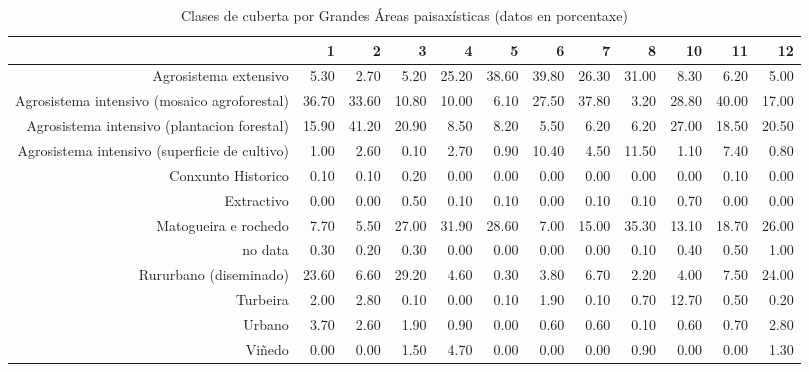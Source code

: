 \begin{table}[p]
\centering
\caption{Clases de cuberta por Grandes Áreas paisaxísticas (datos en porcentaxe)} 
\label{xtaboa2p}
\begin{tabular}{rrrrrrrrrrrr}
  \hline
 & 1 & 2 & 3 & 4 & 5 & 6 & 7 & 8 & 10 & 11 & 12 \\ 
  \hline
Agrosistema extensivo & 5.30 & 2.70 & 5.20 & 25.20 & 38.60 & 39.80 & 26.30 & 31.00 & 8.30 & 6.20 & 5.00 \\ 
  Agrosistema intensivo (mosaico agroforestal) & 36.70 & 33.60 & 10.80 & 10.00 & 6.10 & 27.50 & 37.80 & 3.20 & 28.80 & 40.00 & 17.00 \\ 
  Agrosistema intensivo (plantacion forestal) & 15.90 & 41.20 & 20.90 & 8.50 & 8.20 & 5.50 & 6.20 & 6.20 & 27.00 & 18.50 & 20.50 \\ 
  Agrosistema intensivo (superficie de cultivo) & 1.00 & 2.60 & 0.10 & 2.70 & 0.90 & 10.40 & 4.50 & 11.50 & 1.10 & 7.40 & 0.80 \\ 
  Conxunto Historico & 0.10 & 0.10 & 0.20 & 0.00 & 0.00 & 0.00 & 0.00 & 0.00 & 0.00 & 0.10 & 0.00 \\ 
  Extractivo & 0.00 & 0.00 & 0.50 & 0.10 & 0.10 & 0.00 & 0.10 & 0.10 & 0.70 & 0.00 & 0.00 \\ 
  Matogueira e rochedo & 7.70 & 5.50 & 27.00 & 31.90 & 28.60 & 7.00 & 15.00 & 35.30 & 13.10 & 18.70 & 26.00 \\ 
  no data & 0.30 & 0.20 & 0.30 & 0.00 & 0.00 & 0.00 & 0.00 & 0.10 & 0.40 & 0.50 & 1.00 \\ 
  Rururbano (diseminado) & 23.60 & 6.60 & 29.20 & 4.60 & 0.30 & 3.80 & 6.70 & 2.20 & 4.00 & 7.50 & 24.00 \\ 
  Turbeira & 2.00 & 2.80 & 0.10 & 0.00 & 0.10 & 1.90 & 0.10 & 0.70 & 12.70 & 0.50 & 0.20 \\ 
  Urbano & 3.70 & 2.60 & 1.90 & 0.90 & 0.00 & 0.60 & 0.60 & 0.10 & 0.60 & 0.70 & 2.80 \\ 
  Viñedo & 0.00 & 0.00 & 1.50 & 4.70 & 0.00 & 0.00 & 0.00 & 0.90 & 0.00 & 0.00 & 1.30 \\ 
   \hline
\end{tabular}
\end{table}
